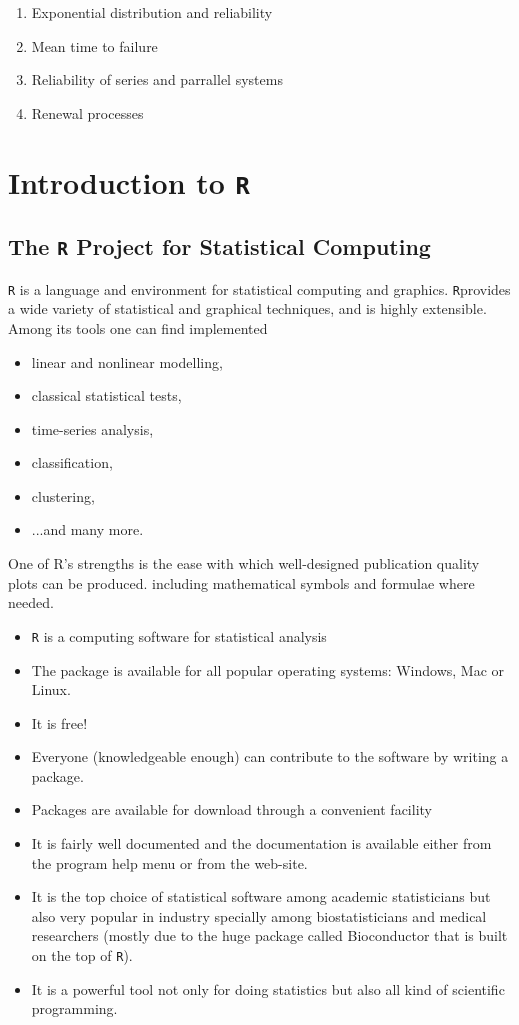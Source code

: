 \begin{enumerate}
	\item Exponential distribution and reliability\item Mean time to
	failure \item Reliability of series and parrallel systems \item
	Renewal processes\end{enumerate}
\newpage
\chapter{Introduction to \texttt{R}}

\section{The \texttt{R} Project for Statistical Computing}

\texttt{R} is a language and environment for statistical computing and graphics. \texttt{R}provides a wide variety of statistical and graphical techniques, and is highly extensible. Among its tools
one can find implemented
\begin{itemize}
	\item linear and nonlinear modelling,
	\item classical statistical tests,
	\item time-series analysis,
	\item classification,
	\item clustering,
	\item ...and many more.
\end{itemize}
One of R's strengths is the ease with which well-designed publication quality plots can be produced.
including mathematical symbols and formulae where needed.
\begin{itemize} \item
	\texttt{R} is a computing software for statistical analysis \item The package is available for all popular operating systems: Windows, Mac or Linux.
	\item It is free!
	\item Everyone (knowledgeable enough) can contribute to the software by
	writing a package.
	\item Packages are available for download through a convenient facility
	\item It is fairly well documented and the documentation is available either
	from the program help menu or from the web-site.
	\item It is the top choice of statistical software among academic statisticians
	but also very popular in industry specially among biostatisticians and
	medical researchers (mostly due to the huge package called
	Bioconductor that is built on the top of \texttt{R}).
	\item It is a powerful tool not only for doing statistics but also all kind of
	scientific programming.
\end{itemize}


